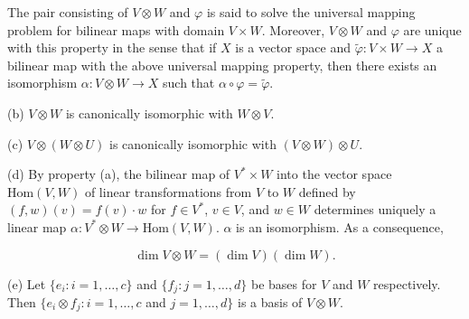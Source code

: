 The pair consisting of $V\otimes W$ and $\varphi$ is said to solve the universal mapping problem for bilinear maps with domain $V\times W$. Moreover, $V\otimes W$ and $\varphi$ are unique with this property in the sense that if $X$ is a vector space and $\tilde{\varphi}:V\times W\to X$ a bilinear map with the above universal mapping property, then there exists an isomorphism $\alpha:V\otimes W\to X$ such that $\alpha\circ\varphi=\tilde{\varphi}$.

\begin{center}
\end{center}

(b)  $ V \otimes W $ is canonically isomorphic with  $ W \otimes V $.

(c)  $ V \otimes (W \otimes U) $ is canonically isomorphic with  $ (V \otimes W) \otimes U $.

(d) By property (a), the bilinear map of $V^{*}\times W$ into the vector space $\mathrm{Hom}(V,W)$ of linear transformations from $V$ to $W$ defined by $(f,w)(v)=f(v)\cdot w$ for $f\in V^{*}$, $v\in V$, and $w\in W$ determines uniquely a linear map $\alpha\colon V^{*}\otimes W\to\mathrm{Hom}(V,W)$. $\alpha$ is an isomorphism. As a consequence,


\[
\dim V\otimes W=(\dim V)(\dim W).
\]

(e) Let $\{e_i: i = 1, \ldots, c\}$ and $\{f_j: j = 1, \ldots, d\}$ be bases for $V$ and $W$ respectively. Then $\{e_i \otimes f_j: i = 1, \ldots, c$ and $j = 1, \ldots, d\}$ is a basis of $V \otimes W$.


